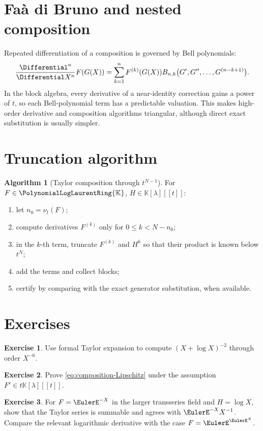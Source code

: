 \documentclass[11pt,openany]{book}
\theoremstyle{definition}
\newtheorem{algorithm}{Algorithm}[chapter]
\newtheorem{exercise}{Exercise}[chapter]
\theoremstyle{plain}
\theoremstyle{remark}
\newcommand{\K}{\mathbb{K}}
\newcommand{\Plog}{\PolynomialLogLaurentRing{\K}}
\newcommand{\val}{\nu}
\begin{document}
\section{Fa\`a di Bruno and nested composition}
Repeated differentiation of a composition is governed by Bell polynomials:
\begin{equation}\label{eq:faa-di-bruno}
 \frac{\Differential^n}{\Differential X^n}F(G(X))
 =\sum_{k=1}^{n}F^{(k)}(G(X))
 B_{n,k}\bigl(G',G'',\ldots,G^{(n-k+1)}\bigr).
\end{equation}
In the block algebra, every derivative of a near-identity correction gains a power of \(t\), so each Bell-polynomial term has a predictable valuation. This makes high-order derivative and composition algorithms triangular, although direct exact substitution is usually simpler.

\section{Truncation algorithm}
\begin{algorithm}[Taylor composition through \(t^{N-1}\)]\label{alg:taylor-composition}
For \(F\in\Plog\), \(H\in\K[\lambda][[t]]\):
\begin{enumerate}
\item let \(n_0=\val_t(F)\);
\item compute derivatives \(F^{(k)}\) only for \(0\le k<N-n_0\);
\item in the \(k\)-th term, truncate \(F^{(k)}\) and \(H^k\) so that their product is known below \(t^N\);
\item add the terms and collect blocks;
\item certify by comparing with the exact generator substitution, when available.
\end{enumerate}
\end{algorithm}

\section{Exercises}
\begin{exercise}
Use formal Taylor expansion to compute \((X+\log X)^{-2}\) through order \(X^{-6}\).
\end{exercise}
\begin{exercise}
Prove \cref{eq:composition-Lipschitz} under the assumption \(F'\in t\K[\lambda][[t]]\).
\end{exercise}
\begin{exercise}
For \(F=\EulerE^{-X}\) in the larger transseries field and \(H=\log X\), show that the Taylor series is summable and agrees with \(\EulerE^{-X}X^{-1}\). Compare the relevant logarithmic derivative with the case \(F=\EulerE^{\EulerE^X}\).
\end{exercise}
\end{document}

